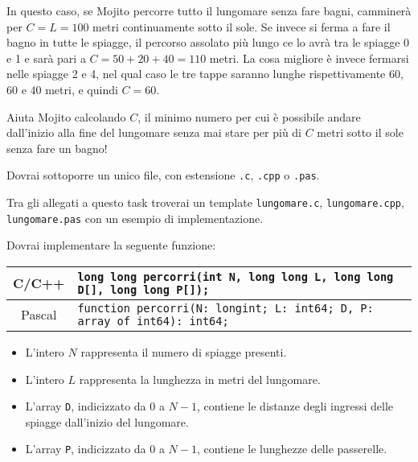 	In questo caso, se Mojito percorre tutto il lungomare senza fare bagni, camminerà per $C = L = 100$ metri continuamente sotto il sole. Se invece si ferma a fare il bagno in tutte le spiagge, il percorso assolato più lungo ce lo avrà tra le spiagge 0 e 1 e sarà pari a $C = 50+20+40 = 110$ metri. La cosa migliore è invece fermarsi nelle spiagge 2 e 4, nel qual caso le tre tappe saranno lunghe rispettivamente $60$, $60$ e $40$ metri, e quindi $C = 60$.
	
	Aiuta Mojito calcolando $C$, il minimo numero per cui è possibile andare dall'inizio alla fine del lungomare senza mai stare per più di $C$ metri sotto il sole senza fare un bagno!


\pagebreak

\Implementation

Dovrai sottoporre un unico file, con estensione \texttt{.c}, \texttt{.cpp} o \texttt{.pas}.

\begin{warning}
Tra gli allegati a questo task troverai un template \texttt{lungomare.c}, \texttt{lungomare.cpp}, \texttt{lungomare.pas} con un esempio di implementazione.
\end{warning}

Dovrai implementare la seguente funzione:

\begin{center}\begin{tabularx}{\textwidth}{|c|X|}
\hline
C/C++  & \verb|long long percorri(int N, long long L, long long D[], long long P[]);|\\
\hline
Pascal  & \verb|function percorri(N: longint; L: int64; D, P: array of int64): int64;|\\
\hline
\end{tabularx}\end{center}

\begin{itemize}[nolistsep]
  \item L'intero $N$ rappresenta il numero di spiagge presenti.
  \item L'intero $L$ rappresenta la lunghezza in metri del lungomare.
  \item L'array \texttt{D}, indicizzato da $0$ a $N-1$, contiene le distanze degli ingressi delle spiagge dall'inizio del lungomare.
  \item L'array \texttt{P}, indicizzato da $0$ a $N-1$, contiene le lunghezze delle passerelle.
\end{itemize}

